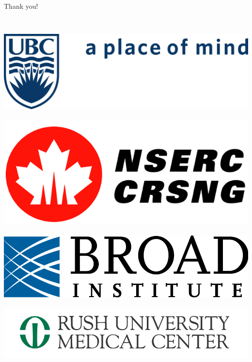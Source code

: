 \documentclass{beamer}
\begin{document}
\begin{frame}{Thank you!}
\begin{columns}
\begin{column}{0.5\textwidth}
\begin{center}
                \hfill\\
                \includegraphics[scale=0.2]{doc/logos/ubc} \\
                \hfill\\
                \includegraphics[scale=0.1]{doc/logos/nserc} \\
                \hfill\\
                \includegraphics[scale=0.1]{doc/logos/broad} \\
                \hfill\\
                \includegraphics[scale=0.1]{doc/logos/rush}
            \end{center}
        \end{column}
    \end{columns}
\end{frame}
\end{document}
